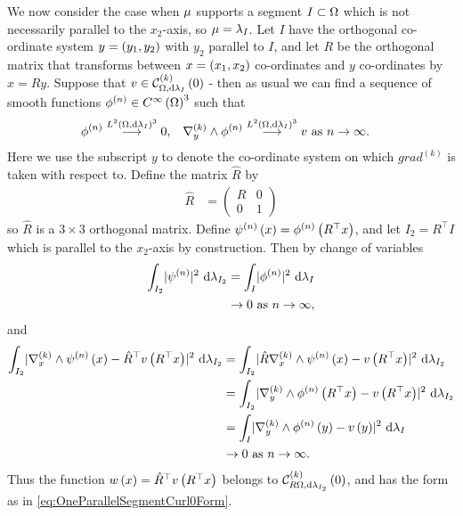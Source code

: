 We now consider the case when $\mu$ supports a segment $I\subset\Omega$ which is not necessarily parallel to the $x_2$-axis, so $\mu=\lambda_I$.
Let $I$ have the orthogonal co-ordinate system $y=\left( y_1,y_2 \right)$ with $y_2$ parallel to $I$, and let $R$ be the orthogonal matrix that transforms between $x=\left( x_1,x_2 \right)$ co-ordinates and $y$ co-ordinates by $x=Ry$.
Suppose that $v\in\mathcal{C}_{ \Omega, \mathrm{d}\lambda_I}^{(k)}\left( 0 \right)$ - then as usual we can find a sequence of smooth functions $\phi^{(n)}\in C^{\infty}\left( \Omega \right)^3$ such that
\begin{align*}
	\phi^{(n)} \overset{L^{2}\left( \Omega,\mathrm{d}\lambda_I \right)^3}{\longrightarrow} 0, &\quad \nabla_{y}^{(k)}\wedge\phi^{(n)} \overset{L^{2}\left( \Omega,\mathrm{d}\lambda_I \right)^3}{\longrightarrow} v \ \text{as} \ n \rightarrow\infty.
\end{align*}
Here we use the subscript $y$ to denote the co-ordinate system on which $grad^{(k)}$ is taken with respect to.
Define the matrix $\hat{R}$ by
\begin{align*}
	\hat{R} &= 
	\begin{pmatrix}
		R & 0 \\
		0 & 1
	\end{pmatrix}
\end{align*}
so $\hat{R}$ is a $3\times3$ orthogonal matrix.
Define $\psi^{(n)}\left( x \right) = \phi^{(n)}\left( R^\top x \right)$, and let $I_2 = R^\top I$ which is parallel to the $x_2$-axis by construction.
Then by change of variables
\begin{align*}
	\int_{I_2}\lvert \psi^{(n)} \rvert^2 \ \mathrm{d}\lambda_{I_2}
	&= \int_{I}\lvert \phi^{(n)} \rvert^2 \ \mathrm{d}\lambda_I \\
	&\rightarrow0 \ \text{as} \ n \rightarrow\infty,
\end{align*}
and
\begin{align*}
	\int_{I_2}\lvert \nabla_{x}^{(k)}\wedge\psi^{(n)}\left( x \right)-\hat{R}^\top v\left( R^\top x \right) \rvert^2 \ \mathrm{d}\lambda_{I_2}
	&= \int_{I_2}\lvert \hat{R}\nabla_{x}^{(k)}\wedge\psi^{(n)}\left( x \right)- v\left( R^\top x \right) \rvert^2 \ \mathrm{d}\lambda_{I_2} \\
	&= \int_{I_2}\lvert \nabla_{y}^{(k)}\wedge\phi^{(n)}\left( R^\top x \right)- v\left( R^\top x \right) \rvert^2 \ \mathrm{d}\lambda_{I_2} \\
	&= \int_{I}\lvert \nabla_{y}^{(k)}\wedge\phi^{(n)}\left( y \right)- v\left( y \right) \rvert^2 \ \mathrm{d}\lambda_I \\
	&\rightarrow0 \ \text{as} \ n \rightarrow\infty.
\end{align*}
Thus the function $w\left( x \right) = \hat{R}^\top v\left( R^\top x \right)$ belongs to $\mathcal{C}_{ R\Omega, \mathrm{d}\lambda_{I_2}}^{(k)}\left( 0 \right)$, and has the form as in \eqref{eq:OneParallelSegmentCurl0Form}.
